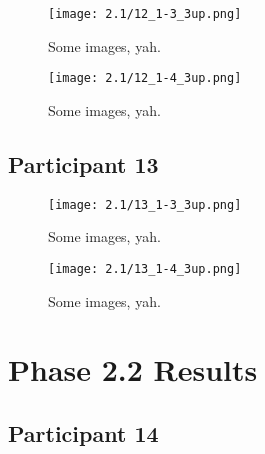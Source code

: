 \begin{figure}[h]
	\begin{center}
	\texttt{[image: 2.1/12\_1-3\_3up.png]}
	\caption{Some images, yah.}
	\end{center}
\end{figure}

\clearpage

\begin{figure}[h]
	\begin{center}
	\texttt{[image: 2.1/12\_1-4\_3up.png]}
	\caption{Some images, yah.}
	\end{center}
\end{figure}


\clearpage

\subsection{Participant 13}

\begin{figure}[h]
	\begin{center}
	\texttt{[image: 2.1/13\_1-3\_3up.png]}
	\caption{Some images, yah.}
	\end{center}
\end{figure}

\clearpage

\begin{figure}[h]
	\begin{center}
	\texttt{[image: 2.1/13\_1-4\_3up.png]}
	\caption{Some images, yah.}
	\end{center}
\end{figure}


\clearpage

\section{Phase 2.2 Results}


\clearpage

\subsection{Participant 14}

